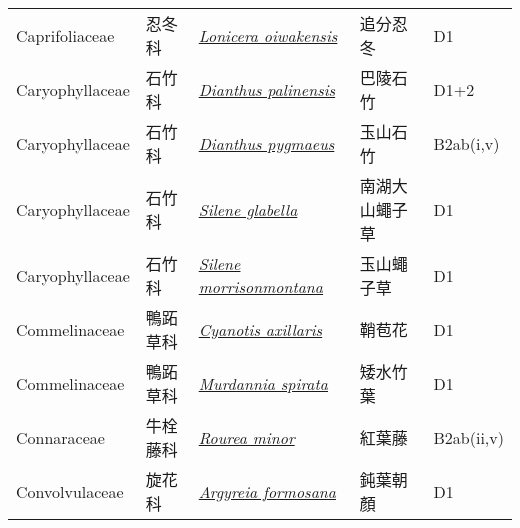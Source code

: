 {\begin{longtable}{L{2.5cm}L{2cm}L{5cm}L{2.5cm}L{3cm}}
    Caprifoliaceae & 忍冬科 & \href{http://www.theplantlist.org/tpl1.1/search?q=Lonicera+oiwakensis}{\textit{Lonicera oiwakensis} } & 追分忍冬 & D1    \\
    Caryophyllaceae & 石竹科 & \href{http://www.theplantlist.org/tpl1.1/search?q=Dianthus+palinensis}{\textit{Dianthus palinensis} } & 巴陵石竹 & D1+2    \\
    Caryophyllaceae & 石竹科 & \href{http://www.theplantlist.org/tpl1.1/search?q=Dianthus+pygmaeus}{\textit{Dianthus pygmaeus} } & 玉山石竹 & B2ab(i,v)    \\
    Caryophyllaceae & 石竹科 & \href{http://www.theplantlist.org/tpl1.1/search?q=Silene+glabella}{\textit{Silene glabella} } & 南湖大山蠅子草 & D1    \\
    Caryophyllaceae & 石竹科 & \href{http://www.theplantlist.org/tpl1.1/search?q=Silene+morrisonmontana}{\textit{Silene morrisonmontana} } & 玉山蠅子草 & D1    \\
    Commelinaceae & 鴨跖草科 & \href{http://www.theplantlist.org/tpl1.1/search?q=Cyanotis+axillaris}{\textit{Cyanotis axillaris} } & 鞘苞花 & D1    \\
    Commelinaceae & 鴨跖草科 & \href{http://www.theplantlist.org/tpl1.1/search?q=Murdannia+spirata}{\textit{Murdannia spirata} } & 矮水竹葉 & D1    \\
    Connaraceae & 牛栓藤科 & \href{http://www.theplantlist.org/tpl1.1/search?q=Rourea+minor}{\textit{Rourea minor} } & 紅葉藤 & B2ab(ii,v)    \\
    Convolvulaceae & 旋花科 & \href{http://www.theplantlist.org/tpl1.1/search?q=Argyreia+formosana}{\textit{Argyreia formosana} } & 鈍葉朝顏 & D1    \\

\end{longtable}}
